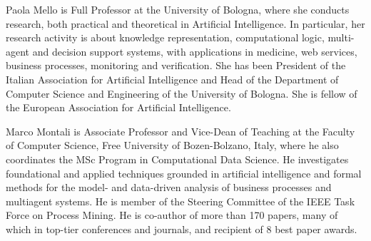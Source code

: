 \documentclass[10pt,journal,compsoc]{IEEEtran}
\theoremstyle{definition}
\theoremstyle{plain}
\begin{document}
\begin{IEEEbiography}{Paola Mello}
is Full Professor at the University of Bologna, where she conducts research, both practical and theoretical in Artificial Intelligence. In particular, her research activity is  about knowledge representation, computational logic, multi-agent and  decision support systems, with applications in medicine, web services, business processes, monitoring and verification.  She has been President of the Italian Association for Artificial Intelligence and Head of the Department of Computer Science and Engineering of the University of Bologna. She is fellow of the European Association for Artificial Intelligence.
\end{IEEEbiography}

\begin{IEEEbiography}{Marco Montali}
is Associate Professor and Vice-Dean of Teaching at the Faculty of Computer Science, Free University of Bozen-Bolzano, Italy, where he also coordinates the MSc Program in Computational Data Science. He investigates foundational and applied techniques grounded in artificial intelligence and formal methods for the model- and data-driven analysis of business processes and multiagent systems. He is member of the Steering Committee of the IEEE Task Force on Process Mining. He is co-author of more than 170 papers, many of which in top-tier conferences and journals, and recipient of 8 best paper awards.\end{IEEEbiography}
\end{document}
